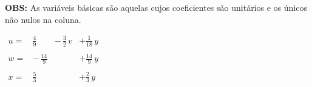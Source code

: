 \textbf{OBS:} As variáveis básicas são aquelas cujos coeficientes são unitários e os únicos não nulos na coluna.

\hspace*{2 cm}
$
  \begin{array}{rrrr}
   u = & \displaystyle \frac{4}{9}    & - \, \displaystyle \frac{3}{2} \, v & + \displaystyle \frac{1}{18} \, y\\\\
   w = & - \, \displaystyle \frac{14}{9} &                 & + \displaystyle \frac{14}{9} \, y\\\\
   x = & \displaystyle \frac{5}{3}    &                 & + \displaystyle \frac{2}{3} \, y
  \end{array}
$
